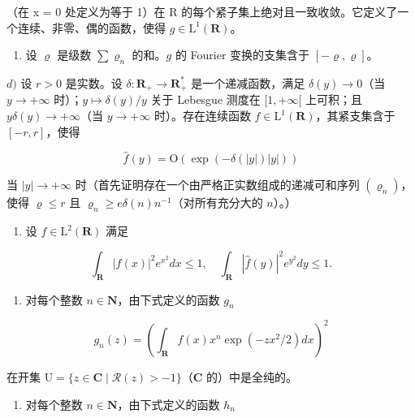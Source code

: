 （在 x = 0 处定义为等于 1）在 R 的每个紧子集上绝对且一致收敛。它定义了一个连续、非零、偶的函数，使得 \(g \in \mathrm{L}^{1}(\mathbf{R})\)。

\begin{enumerate}
\def\labelenumi{\alph{enumi})}
\setcounter{enumi}{2}
\tightlist
\item
  设 \(\varrho\) 是级数 \(\sum \varrho_{n}\) 的和。\(g\) 的 Fourier 变换的支集含于 \([- \varrho, \varrho]\)。
\end{enumerate}

\(d)\) 设 \(r > 0\) 是实数。设 \(\delta: \mathbf{R}_{+} \to \mathbf{R}_{+}^{*}\) 是一个递减函数，满足 \(\delta(y) \to 0\)（当 \(y \to +\infty\) 时）；\(y \mapsto \delta(y)/y\) 关于 Lebesgue 测度在 \([1, +\infty[\) 上可积；且 \(y\delta(y) \to +\infty\)（当 \(y \to +\infty\) 时）。存在连续函数 \(f \in \mathrm{L}^{1}(\mathbf{R})\)，其紧支集含于 \([-r, r]\)，使得

\[
\widehat {f} (y) = \mathrm{O} (\exp (- \delta (| y |) | y |))
\]

当 \(|y| \to +\infty\) 时（首先证明存在一个由严格正实数组成的递减可和序列 \((\varrho_n)\)，使得 \(\varrho \leqslant r\) 且 \(\varrho_n \geqslant e\delta(n)n^{-1}\)（对所有充分大的 \(n\)）。）

\begin{enumerate}
\def\labelenumi{\arabic{enumi})}
\setcounter{enumi}{28}
\tightlist
\item
  设 \(f\in \mathrm{L}^2 (\mathbf{R})\) 满足
\end{enumerate}

\[
\int_ {\mathbf {R}} | f (x) | ^ {2} e ^ {x ^ {2}} d x \leqslant 1, \quad \int_ {\mathbf {R}} | \widehat {f} (y) | ^ {2} e ^ {y ^ {2}} d y \leqslant 1.
\]

\begin{enumerate}
\def\labelenumi{\alph{enumi})}
\tightlist
\item
对每个整数 \(n \in \mathbf{N}\)，由下式定义的函数 \(g_n\)
\end{enumerate}

\[
g _ {n} (z) = \left(\int_ {\mathbf {R}} f (x) x ^ {n} \exp (- z x ^ {2} / 2) d x\right) ^ {2}
\]

在开集 \(\mathrm{U} = \{z \in \mathbf{C} \mid \mathcal{R}(z) > -1\}\)（\(\mathbf{C}\) 的）中是全纯的。

\begin{enumerate}
\def\labelenumi{\alph{enumi})}
\setcounter{enumi}{1}
\tightlist
\item
对每个整数 \(n \in \mathbf{N}\)，由下式定义的函数 \(h_n\)
\end{enumerate}


